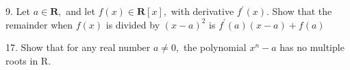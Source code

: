 \begin{mdframed}[style=darkAnswer,frametitle={Joe Starr}]
\end{mdframed}
\newpage
\begin{mdframed}[style=darkQuesion]
  9. Let $a \in \mathbf{R},$ and let $f(x) \in \mathbf{R}[x],$ with derivative $f^{\prime}(x) .$ Show that the remainder when $f(x)$ is divided by $(x-a)^{2}$ is $f^{\prime}(a)(x-a)+f(a)$
\end{mdframed}
\begin{mdframed}[style=darkAnswer,frametitle={Joe Starr}]
\end{mdframed}
\newpage
\begin{mdframed}[style=darkQuesion]
  17. Show that for any real number $a \neq 0,$ the polynomial $x^{n}-a$ has no multiple roots
  in R.
\end{mdframed}
\begin{mdframed}[style=darkAnswer,frametitle={Joe Starr}]
\end{mdframed}
\newpage